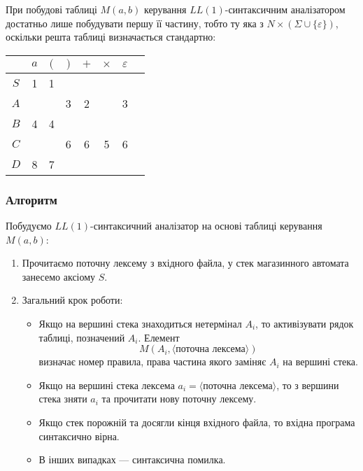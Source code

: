 При побудові таблиці $M(a,b)$ керування $LL(1)$-синтаксичним аналізатором достатньо лише побудувати першу її частину, тобто ту яка з $N \times (\Sigma \cup \{\varepsilon\})$, оскільки решта таблиці визначається стандартно:
\begin{table}[H]
	\centering
	\begin{tabular}{|c|c|c|c|c|c|c|c|}
		\hline
		& $a$ & $($ & $)$ & $+$ & $\times$ & $\varepsilon$ \\ \hline
		$S$ & 1 & 1 &  &  &  &   \\ \hline
		$A$ &  &  & 3 & 2 &  & 3 \\ \hline
		$B$ & 4 & 4 &  &  &  &  \\ \hline
		$C$ &  &  & 6 & 6 & 5 & 6 \\ \hline
		$D$ & 8 & 7 &  &  &  &  \\ \hline
	\end{tabular}
\end{table}

\subsubsection{Алгоритм}

Побудуємо $LL(1)$-синтаксичний аналізатор на основі таблиці керування $M(a,b)$:
\begin{enumerate}
	\item Прочитаємо поточну лексему з вхідного файла, у стек магазинного автомата занесемо аксіому $S$.
	\item Загальний крок роботи:
	\begin{itemize}
		\item Якщо на вершині стека знаходиться нетермінал $A_i$, то активізувати рядок таблиці, позначений $A_i$. Елемент
		\begin{equation}
		    M(A_i, \langle\text{поточна лексема}\rangle)
		\end{equation}
		визначає номер правила, права частина якого заміняє $A_i$ на вершині стека.
		\item Якщо на вершині стека лексема $a_i = \langle\text{поточна лексема}\rangle$, то з вершини стека зняти $a_i$ та прочитати нову поточну лексему.
		\item Якщо стек порожній та досягли кінця вхідного файла, то вхідна програма синтаксично вірна.
		\item В інших випадках --- синтаксична помилка.
	\end{itemize}
\end{enumerate}

